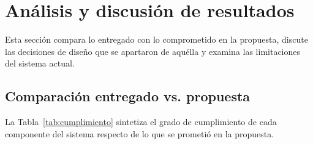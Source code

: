 \section{Análisis y discusión de resultados}\label{sec:analisis}
\justifying

Esta sección compara lo entregado con lo comprometido en la propuesta, discute las decisiones de diseño que se apartaron de aquélla y examina las limitaciones del sistema actual.

\subsection{Comparación entregado vs. propuesta}

La Tabla~\ref{tab:cumplimiento} sintetiza el grado de cumplimiento de cada componente del sistema respecto de lo que se prometió en la propuesta.

